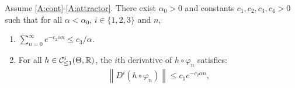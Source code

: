 \documentclass{article}
\newcommand{\R}{\mathbb{R}}
\newcommand\norm[1]{\left\|#1\right\|}
\newcommand\cont[3][]{\mathcal{C}^{#2}_{\ifthenelse{\equal{#1}{all}}{}{\le1}}(#3,\R)}
\begin{document}
\begin{lemma}
    \label{lemma:exponentially_small_derivatives}
    Assume \ref{A:cont}-\ref{A:attractor}. There exist $\alpha_0>0$ and constants $c_1,c_2,c_3,c_4>0$ such that for all $\alpha<\alpha_0$, $i\in\{1,2,3\}$ and $n$, 
    \begin{enumerate}[label=(\roman*)]
        \item $\sum_{n=0}^\infty e^{-c_2\alpha n} \le c_3/\alpha$.
        \item For all $h\in\cont{i}{\Theta}$, the $i$th derivative of $h\circ\varphi_n$ satisfies:
        \begin{align*}
            \norm{D^i(h\circ\varphi_n)} \le c_1 e^{-c_2\alpha n},
        \end{align*}
        \end{enumerate} 
\end{lemma}
\end{document}

